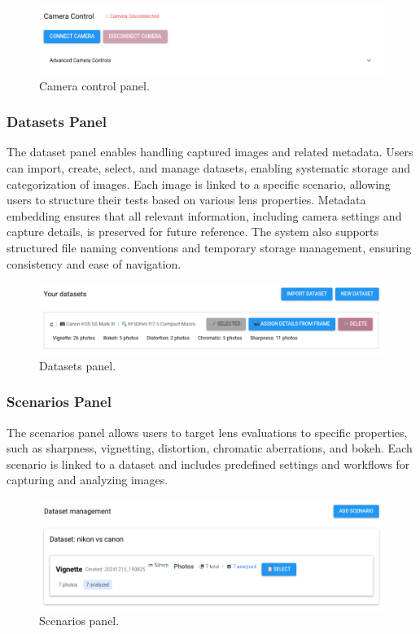 \begin{figure}[h]
\centering
\includegraphics[width=1\textwidth]{Images/camera_control.png}
\caption{Camera control panel.}
\label{fig:ui_camera_control}
\end{figure}

\subsubsection{Datasets Panel}
The dataset panel enables handling captured images and related metadata. Users can import, create, select, and manage datasets, enabling systematic storage and categorization of images. Each image is linked to a specific scenario, allowing users to structure their tests based on various lens properties. Metadata embedding ensures that all relevant information, including camera settings and capture details, is preserved for future reference. The system also supports structured file naming conventions and temporary storage management, ensuring consistency and ease of navigation.

\begin{figure}[h]
\centering
\includegraphics[width=1\textwidth]{Images/datasets_panel.png}
\caption{Datasets panel.}
\label{fig:ui_datasets}
\end{figure}

\subsubsection{Scenarios Panel} %
The scenarios panel allows users to target lens evaluations to specific properties, such as sharpness, vignetting, distortion, chromatic aberrations, and bokeh. Each scenario is linked to a dataset and includes predefined settings and workflows for capturing and analyzing images.

\begin{figure}[hbt]
\centering
\includegraphics[width=1\textwidth]{Images/scenarios_panel.png}
\caption{Scenarios panel.}
\label{fig:ui_scenarios}
\end{figure}


